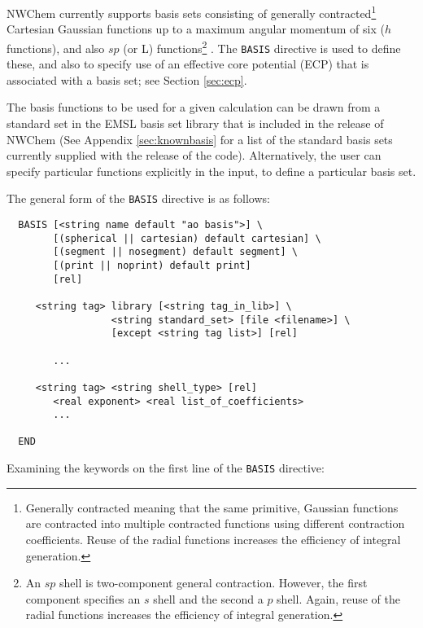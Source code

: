 \label{sec:basis} 

NWChem currently supports basis sets consisting of generally
contracted\footnote{Generally contracted meaning that the same
  primitive, Gaussian functions are contracted into multiple
  contracted functions using different contraction coefficients.
  Reuse of the radial functions increases the efficiency of integral
  generation.} Cartesian Gaussian functions up to a maximum angular
momentum of six ($h$ functions), and also $sp$ (or L)
functions\footnote{An $sp$ shell is two-component general contraction.
  However, the first component specifies an $s$ shell and the second a
  $p$ shell.  Again, reuse of the radial functions increases the efficiency
  of integral generation.} .  The {\tt BASIS} directive is used to
define these, and also to specify use of an effective core potential
(ECP) that is associated with a basis set; see Section \ref{sec:ecp}.

The basis functions to be used for a given calculation can be drawn
from a standard set in the EMSL basis set library that is included in
the release of NWChem  (See Appendix \ref{sec:knownbasis} for a list
of the standard basis sets currently supplied with the release of the
code).  Alternatively, the user can specify particular functions
explicitly in the input, to define a particular basis set.

The general form of the \verb+BASIS+ directive is as follows:

\begin{verbatim}
  BASIS [<string name default "ao basis">] \
        [(spherical || cartesian) default cartesian] \
        [(segment || nosegment) default segment] \
        [(print || noprint) default print]
        [rel]

     <string tag> library [<string tag_in_lib>] \
                  <string standard_set> [file <filename>] \
                  [except <string tag list>] [rel]

        ...

     <string tag> <string shell_type> [rel]
        <real exponent> <real list_of_coefficients>
        ...
     
  END
\end{verbatim}    

Examining the keywords on the first line of the \verb+BASIS+ directive:


